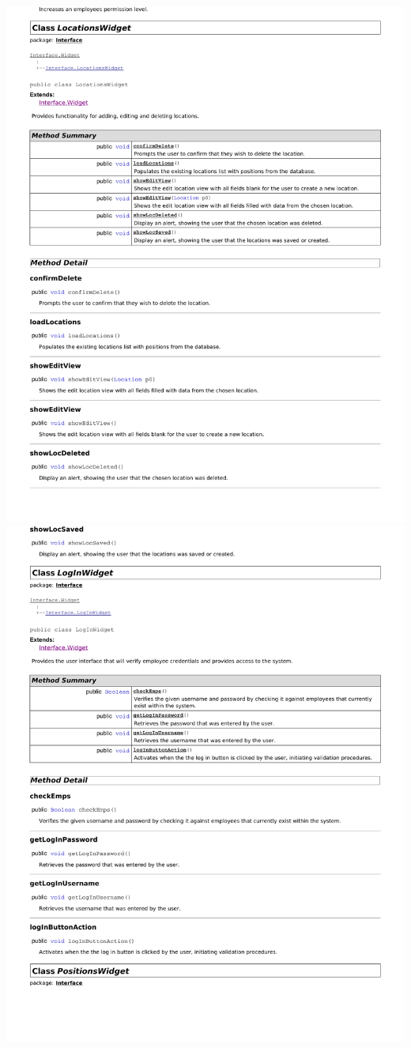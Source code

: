 \documentclass[letterpaper,12pt]{report}
\begin{document}
\newpage
\includegraphics[scale=0.9,trim=20mm 30mm 25mm 5mm]{externals/di4.pdf}
\newpage
\includegraphics[scale=0.9,trim=20mm 30mm 25mm 5mm]{externals/di5.pdf}
\end{document}
